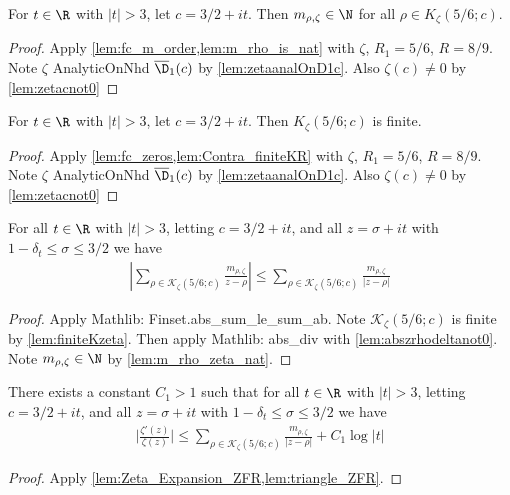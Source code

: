\begin{lemma}\label{lem:m_rho_zeta_nat}  \leanok
For $t\in\R$ with $|t|>3$, let $c=3/2+it$. Then $m_{\rho,\zeta}\in\N$ for all $\rho\in K_{\zeta}(5/6;c)$.
\end{lemma}
\begin{proof}
\leanok
Apply \cref{lem:fc_m_order,lem:m_rho_is_nat} with $\zeta$, $R_1=5/6$, $R=8/9$.
Note $\zeta$ AnalyticOnNhd $\overline{\D}_1(c)$ by \cref{lem:zetaanalOnD1c}. Also $\zeta(c)\neq0$ by \cref{lem:zetacnot0}
\end{proof}

\begin{lemma}\label{lem:finiteKzeta}  \leanok
For $t\in\R$ with $|t|>3$, let $c=3/2+it$. Then $K_{\zeta}(5/6;c)$ is finite.
\end{lemma}
\begin{proof}
\leanok
Apply \cref{lem:fc_zeros,lem:Contra_finiteKR} with $\zeta$, $R_1=5/6$, $R=8/9$.
Note $\zeta$ AnalyticOnNhd $\overline{\D}_1(c)$ by \cref{lem:zetaanalOnD1c}. Also $\zeta(c)\neq0$ by \cref{lem:zetacnot0}
\end{proof}

\begin{lemma}[Triangle]\label{lem:triangle_ZFR}  \leanok
For all $t\in\R$ with $|t|>3$, letting $c=3/2+it$, and all $z=\sigma+it$ with $1-\delta_t \le \sigma \le 3/2$ we have
\begin{align*}
\left|\sum_{\rho\in\mathcal K_{\zeta}(5/6;c)} \frac{m_{\rho,\zeta}}{z-\rho} \right| \le \sum_{\rho\in\mathcal K_{\zeta}(5/6;c)} \frac{m_{\rho,\zeta}}{|z-\rho|}
\end{align*}
\end{lemma}
\begin{proof}
\leanok
Apply Mathlib: Finset.abs\_sum\_le\_sum\_ab. Note $\mathcal K_{\zeta}(5/6;c)$ is finite by \cref{lem:finiteKzeta}.
Then apply Mathlib: abs\_div with \cref{lem:abszrhodeltanot0}. Note $m_{\rho,\zeta}\in \N$ by \cref{lem:m_rho_zeta_nat}.
\end{proof}


\begin{lemma}[Triangle]\label{lem:Zeta_Triangle_ZFR}  \leanok
There exists a constant $C_1>1$ such that for all $t\in\R$ with $|t|>3$, letting $c=3/2+it$, and all $z=\sigma+it$ with $1-\delta_t \le \sigma \le 3/2$ we have
\begin{align*}
\Big|\frac{\zeta'(z)}{\zeta(z)}\Big| \le  \sum_{\rho\in\mathcal K_{\zeta}(5/6;c)} \frac{m_{\rho,\zeta}}{|z-\rho|} + C_1\log|t|
\end{align*}
\end{lemma}
\begin{proof}
\leanok
Apply \cref{lem:Zeta_Expansion_ZFR,lem:triangle_ZFR}.
\end{proof}

